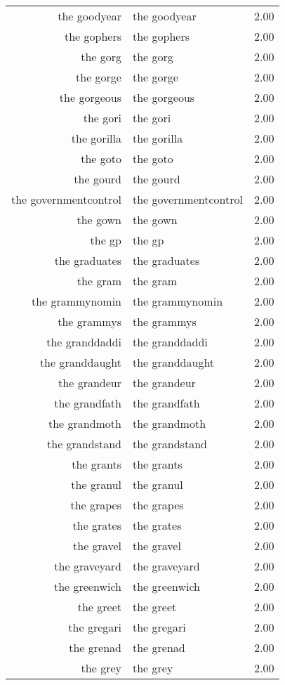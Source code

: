 \begin{table}[ht]
\begin{tabular}{rlr}
  the goodyear & the goodyear & 2.00 \\ 
  the gophers & the gophers & 2.00 \\ 
  the gorg & the gorg & 2.00 \\ 
  the gorge & the gorge & 2.00 \\ 
  the gorgeous & the gorgeous & 2.00 \\ 
  the gori & the gori & 2.00 \\ 
  the gorilla & the gorilla & 2.00 \\ 
  the goto & the goto & 2.00 \\ 
  the gourd & the gourd & 2.00 \\ 
  the governmentcontrol & the governmentcontrol & 2.00 \\ 
  the gown & the gown & 2.00 \\ 
  the gp & the gp & 2.00 \\ 
  the graduates & the graduates & 2.00 \\ 
  the gram & the gram & 2.00 \\ 
  the grammynomin & the grammynomin & 2.00 \\ 
  the grammys & the grammys & 2.00 \\ 
  the granddaddi & the granddaddi & 2.00 \\ 
  the granddaught & the granddaught & 2.00 \\ 
  the grandeur & the grandeur & 2.00 \\ 
  the grandfath & the grandfath & 2.00 \\ 
  the grandmoth & the grandmoth & 2.00 \\ 
  the grandstand & the grandstand & 2.00 \\ 
  the grants & the grants & 2.00 \\ 
  the granul & the granul & 2.00 \\ 
  the grapes & the grapes & 2.00 \\ 
  the grates & the grates & 2.00 \\ 
  the gravel & the gravel & 2.00 \\ 
  the graveyard & the graveyard & 2.00 \\ 
  the greenwich & the greenwich & 2.00 \\ 
  the greet & the greet & 2.00 \\ 
  the gregari & the gregari & 2.00 \\ 
  the grenad & the grenad & 2.00 \\ 
  the grey & the grey & 2.00 \\ 

\end{tabular}
\end{table}
